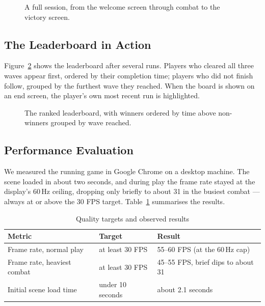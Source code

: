 \documentclass[12pt,a4paper]{report}
\begin{document}
\begin{figure}[H]
\centering
{}
\caption{A full session, from the welcome screen through combat to the victory
screen.}
\label{fig:walkthrough}
\end{figure}

\subsection{The Leaderboard in Action}

Figure~\ref{fig:board} shows the leaderboard after several runs. Players who
cleared all three waves appear first, ordered by their completion time; players
who did not finish follow, grouped by the furthest wave they reached. When the
board is shown on an end screen, the player's own most recent run is highlighted.

\begin{figure}[H]
\centering
{}
\caption{The ranked leaderboard, with winners ordered by time above non-winners
grouped by wave reached.}
\label{fig:board}
\end{figure}

\subsection{Performance Evaluation}

We measured the running game in Google Chrome on a desktop machine. The scene
loaded in about two seconds, and during play the frame rate stayed at the
display's 60\,Hz ceiling, dropping only briefly to about 31 in the busiest
combat --- always at or above the 30 FPS target. Table~\ref{tab:perf}
summarises the results.

\begin{table}[htbp]
\centering
\caption{Quality targets and observed results}
\label{tab:perf}
\begin{tabular}{|p{5.2cm}|p{2.6cm}|p{4.2cm}|}
\hline
Metric & Target & Result \\
\hline
Frame rate, normal play & at least 30 FPS & 55--60 FPS (at the 60\,Hz cap) \\
\hline
Frame rate, heaviest combat & at least 30 FPS & 45--55 FPS, brief dips to about 31 \\
\hline
Initial scene load time & under 10 seconds & about 2.1 seconds \\
\hline
\end{tabular}
\end{table}
\end{document}
